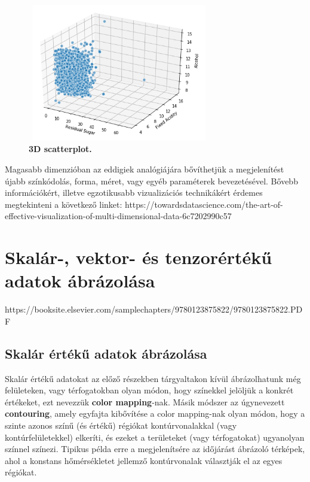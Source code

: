 \documentclass[12pt]{article}
\theoremstyle{plain}
\begin{document}
 \begin{figure}[H]
    \centering
    \includegraphics[width=8cm, height=6cm]{media/3dcont.png}
    \caption{\textbf{3D scatterplot.}}
    \label{fig:GeneralDiagram}
 \end{figure}

 Magasabb dimenzióban az eddigiek analógiájára bővíthetjük a megjelenítést újabb színkódolás, forma, méret, vagy egyéb paraméterek bevezetésével. \newline
 Bővebb információkért, illetve egzotikusabb vizualizációs technikákért érdemes megtekinteni a következő linket: https://towardsdatascience.com/the-art-of-effective-visualization-of-multi-dimensional-data-6c7202990c57
 
 \section{Skalár-, vektor- és tenzorértékű adatok ábrázolása}
 https://booksite.elsevier.com/samplechapters/9780123875822/9780123875822.PDF
 \subsection{Skalár értékű adatok ábrázolása}
 
 Skalár értékű adatokat az előző részekben tárgyaltakon kívül ábrázolhatunk még felületeken, vagy térfogatokban olyan módon, hogy színekkel jelöljük a konkrét értékeket, ezt nevezzük \textbf{color mapping}-nak. \newline
 Másik módszer az úgynevezett \textbf{contouring}, amely egyfajta kibővítése a color mapping-nak olyan módon, hogy a szinte azonos színű (és értékű) régiókat kontúrvonalakkal (vagy kontúrfelületekkel) elkeríti, és ezeket a területeket (vagy térfogatokat) ugyanolyan színnel színezi. Tipikus példa erre a megjelenítsére az időjárást ábrázoló térképek, ahol a konstans hőmérsékletet jellemző kontúrvonalak választják el az egyes régiókat.
 
\end{document}
